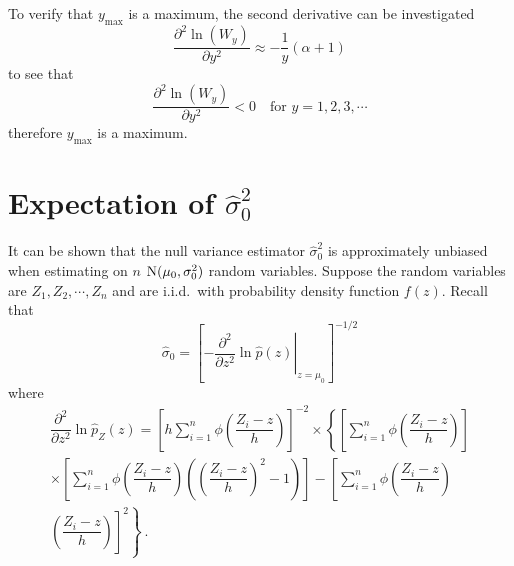 To verify that $y_\text{max}$ is a maximum, the second derivative can be investigated
\begin{equation}
  \frac{\partial^2\ln(W_y)}{\partial y^2}
  \approx
  -\frac{1}{y}(\alpha+1)
\end{equation}
to see that
\begin{equation}
  \frac{\partial^2\ln(W_y)}{\partial y^2} < 0 \quad \text{for }y=1,2,3,\cdots
\end{equation}
therefore $y_\text{max}$ is a maximum.

\chapter{Expectation of $\widehat{\sigma}^2_0$}
\label{chapter:appendix_expectationNullStdEstimator}

It can be shown that the null variance estimator $\widehat{\sigma}_0^2$ is approximately unbiased when estimating on $n$ $\operatorname{N}(\mu_0, \sigma_0^2)$ random variables. Suppose the random variables are $Z_1, Z_2, \cdots, Z_n$ and are i.i.d.~with probability density function $f(z)$. Recall that
\begin{equation}
  \widehat{\sigma}_0 = \left[
    \left.
      -\dfrac{\partial^2}{\partial z^2}\ln\widehat{p}(z)
    \right|_{z=\widehat{\mu}_0}
  \right]^{-1/2}
\end{equation}
where
\begin{multline}
  \dfrac{
    \partial^2
  }
  {
    \partial z^2
  }
  \ln\widehat{p}_Z(z)
  =
  \left[
    h\sum_{i=1}^n
    \phi\left(
      \dfrac{
        Z_i-z
      }
      {
        h
      }
    \right)
  \right]^{-2}
  \times
  \left\{
    \left[
      \sum_{i=1}^n
      \phi\left(
        \dfrac{
          Z_i-z
        }
        {
          h
        }
      \right)
    \right]
  \right.
  \\
  \left.
    \times
    \left[
      \sum_{i=1}^n
      \phi\left(
        \dfrac{
          Z_i-z
        }
        {
          h
        }
      \right)
      \left(
        \left(
          \dfrac{
            Z_i-z
          }
          {
            h
          }
        \right)^2
        -1
      \right)
    \right]
    -
    \left[
      \sum_{i=1}^n
      \phi\left(
        \dfrac{
          Z_i-z
        }
        {
          h
        }
      \right)
    \right.
  \right.
  \\
  \left.
    \left.
      \left(
        \dfrac{
          Z_i-z
        }
        {
          h
        }
      \right)
    \right]^2
  \right\}
  \ .
\end{multline}
